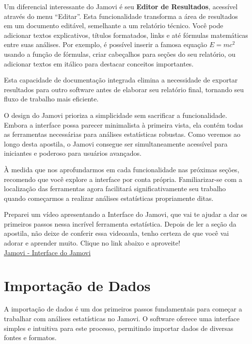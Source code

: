 Um diferencial interessante do Jamovi é seu \textbf{Editor de Resultados}, acessível através do menu ``Editar''. Esta funcionalidade transforma a área de resultados em um documento editável, semelhante a um relatório técnico. Você pode adicionar textos explicativos, títulos formatados, links e até fórmulas matemáticas entre suas análises. Por exemplo, é possível inserir a famosa equação $E=mc^2$ usando a função de fórmulas, criar cabeçalhos para seções do seu relatório, ou adicionar textos em itálico para destacar conceitos importantes.

Esta capacidade de documentação integrada elimina a necessidade de exportar resultados para outro software antes de elaborar seu relatório final, tornando seu fluxo de trabalho mais eficiente.

O design do Jamovi prioriza a simplicidade sem sacrificar a funcionalidade. Embora a interface possa parecer minimalista à primeira vista, ela contém todas as ferramentas necessárias para análises estatísticas robustas. Como veremos ao longo desta apostila, o Jamovi consegue ser simultaneamente acessível para iniciantes e poderoso para usuários avançados.

À medida que nos aprofundarmos em cada funcionalidade nas próximas seções, recomendo que você explore a interface por conta própria. Familiarizar-se com a localização das ferramentas agora facilitará significativamente seu trabalho quando começarmos a realizar análises estatísticas propriamente ditas.

\begin{tcolorbox}[colback=white,colframe=red,title={\faPlayCircle \ Dica de Conteúdo}]
  Preparei um vídeo apresentando a Interface do Jamovi, que vai te ajudar a dar os primeiros passos nessa incrível ferramenta estatística. Depois de ler a seção da apostila, não deixe de conferir essa videoaula, tenho certeza de que você vai adorar e aprender muito. Clique no link abaixo e aproveite!\\
  \textcolor{red}{\faYoutube} \href{https://youtu.be/bV9hlHPLe5I?si=h43c1jAG01oxltOB}{Jamovi - Interface do Jamovi}
\end{tcolorbox}

\section{Importação de Dados}

A importação de dados é um dos primeiros passos fundamentais para começar a trabalhar com análises estatísticas no Jamovi. O software oferece uma interface simples e intuitiva para este processo, permitindo importar dados de diversas fontes e formatos.

